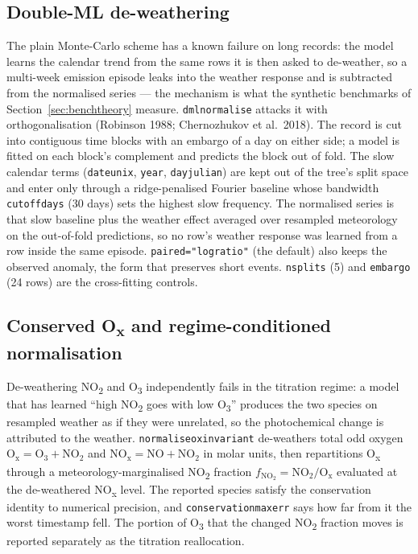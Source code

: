 \documentclass[11pt]{report}
\newcommand{\codeunderscore}{\textunderscore\allowbreak}
\newcommand{\code}[1]{\texttt{\let\_\codeunderscore #1}}
\newcommand{\NOtwo}{NO\textsubscript{2}}
\newcommand{\NOx}{NO\textsubscript{x}}
\begin{document}
\subsection{Double-ML de-weathering}\label{sec:dmltheory}
The plain Monte-Carlo scheme has a known failure on long records: the model learns the
calendar trend from the same rows it is then asked to de-weather, so a multi-week
emission episode leaks into the weather response and is subtracted from the normalised
series --- the mechanism is what the synthetic benchmarks of
Section~\ref{sec:benchtheory} measure. \code{dml\_normalise}
attacks it with orthogonalisation (Robinson 1988; Chernozhukov et al.\ 2018). The
record is cut into contiguous time blocks with an embargo of a day on either side; a
model is fitted on each block's complement and predicts the block out of fold. The slow
calendar terms (\code{date\_unix}, \code{year}, \code{day\_julian}) are kept out of
the tree's split space and enter only through a ridge-penalised Fourier baseline whose
bandwidth \code{cutoff\_days} (30 days) sets the highest slow frequency. The
normalised series is that slow baseline plus the weather effect averaged over
resampled meteorology on the out-of-fold predictions, so no row's weather response
was learned from a row inside the same episode. \code{paired="log\_ratio"} (the
default) also keeps the observed anomaly, the form that preserves short events.
\code{n\_splits} (5) and \code{embargo} (24 rows) are the cross-fitting controls.

\subsection{Conserved O\textsubscript{x} and regime-conditioned normalisation}
\label{sec:chemtheory}
De-weathering \NOtwo{} and O\textsubscript{3} independently fails in the titration
regime: a model that has learned ``high \NOtwo{} goes with low O\textsubscript{3}''
produces the two species on resampled weather as if they were unrelated, so the
photochemical change is attributed to the weather. \code{normalise\_ox\_invariant}
de-weathers total odd oxygen $\mathrm{O_x} = \mathrm{O_3} + \mathrm{NO_2}$ and
$\mathrm{NO_x} = \mathrm{NO} + \mathrm{NO_2}$ in molar units, then repartitions
O\textsubscript{x} through a meteorology-marginalised \NOtwo{} fraction
$f_{\mathrm{NO_2}} = \mathrm{NO_2}/\mathrm{O_x}$ evaluated at the de-weathered
\NOx{} level. The reported species satisfy the conservation identity to numerical
precision, and \code{conservation\_max\_err} says how far from it the worst timestamp
fell. The portion of O\textsubscript{3} that the changed \NOtwo{} fraction moves is
reported separately as the titration reallocation.
\end{document}
